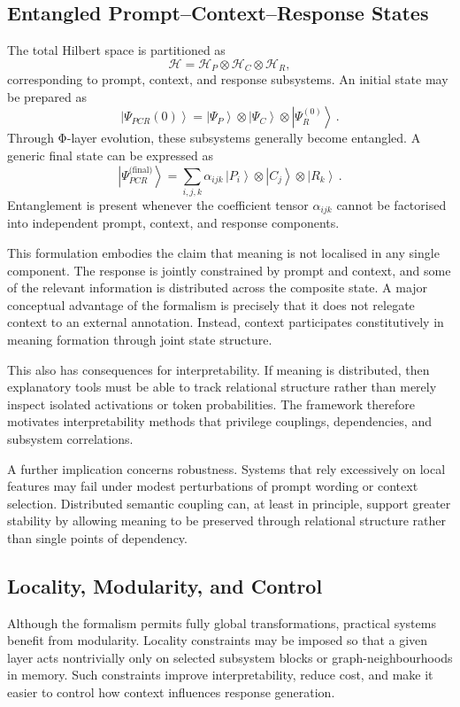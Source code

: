 \documentclass[12pt]{article}
\newcommand{\ket}[1]{\left|#1\right\rangle}
\begin{document}
\subsection{Entangled Prompt--Context--Response States}
The total Hilbert space is partitioned as
\begin{equation}
\mathcal{H} = \mathcal{H}_P \otimes \mathcal{H}_C \otimes \mathcal{H}_R,
\end{equation}
corresponding to prompt, context, and response subsystems. An initial state may be prepared as
\begin{equation}
\ket{\Psi_{PCR}(0)} = \ket{\Psi_P} \otimes \ket{\Psi_C} \otimes \ket{\Psi_R^{(0)}}\,.
\end{equation}
Through Φ-layer evolution, these subsystems generally become entangled. A generic final state can be expressed as
\begin{equation}\label{eq:entangled-state}
\ket{\Psi_{PCR}^{\text{(final)}}} = \sum_{i,j,k} \alpha_{ijk}\,\ket{P_i} \otimes \ket{C_j} \otimes \ket{R_k}\,.
\end{equation}
Entanglement is present whenever the coefficient tensor $\alpha_{ijk}$ cannot be factorised into independent prompt, context, and response components.

This formulation embodies the claim that meaning is not localised in any single component. The response is jointly constrained by prompt and context, and some of the relevant information is distributed across the composite state. A major conceptual advantage of the formalism is precisely that it does not relegate context to an external annotation. Instead, context participates constitutively in meaning formation through joint state structure.

This also has consequences for interpretability. If meaning is distributed, then explanatory tools must be able to track relational structure rather than merely inspect isolated activations or token probabilities. The framework therefore motivates interpretability methods that privilege couplings, dependencies, and subsystem correlations.

A further implication concerns robustness. Systems that rely excessively on local features may fail under modest perturbations of prompt wording or context selection. Distributed semantic coupling can, at least in principle, support greater stability by allowing meaning to be preserved through relational structure rather than single points of dependency.

\subsection{Locality, Modularity, and Control}
Although the formalism permits fully global transformations, practical systems benefit from modularity. Locality constraints may be imposed so that a given layer acts nontrivially only on selected subsystem blocks or graph-neighbourhoods in memory. Such constraints improve interpretability, reduce cost, and make it easier to control how context influences response generation.
\end{document}
